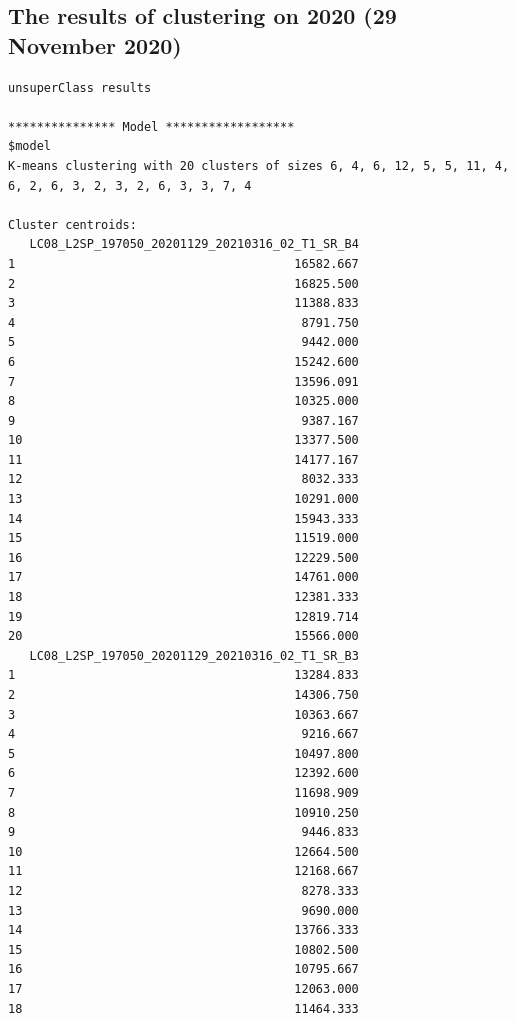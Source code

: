 \documentclass[remotesensing,article,submit,pdftex,moreauthors]{Definitions/mdpi}
\begin{document}
\subsection[\appendixname~\thesubsection]{The results of clustering on 2020 (29 November 2020)}
\begin{scriptsize}
\begin{verbatim}
unsuperClass results

*************** Model ******************
$model
K-means clustering with 20 clusters of sizes 6, 4, 6, 12, 5, 5, 11, 4, 6, 2, 6, 3, 2, 3, 2, 6, 3, 3, 7, 4

Cluster centroids:
   LC08_L2SP_197050_20201129_20210316_02_T1_SR_B4
1                                       16582.667
2                                       16825.500
3                                       11388.833
4                                        8791.750
5                                        9442.000
6                                       15242.600
7                                       13596.091
8                                       10325.000
9                                        9387.167
10                                      13377.500
11                                      14177.167
12                                       8032.333
13                                      10291.000
14                                      15943.333
15                                      11519.000
16                                      12229.500
17                                      14761.000
18                                      12381.333
19                                      12819.714
20                                      15566.000
   LC08_L2SP_197050_20201129_20210316_02_T1_SR_B3
1                                       13284.833
2                                       14306.750
3                                       10363.667
4                                        9216.667
5                                       10497.800
6                                       12392.600
7                                       11698.909
8                                       10910.250
9                                        9446.833
10                                      12664.500
11                                      12168.667
12                                       8278.333
13                                       9690.000
14                                      13766.333
15                                      10802.500
16                                      10795.667
17                                      12063.000
18                                      11464.333

\end{verbatim}
\end{scriptsize}
\end{document}
